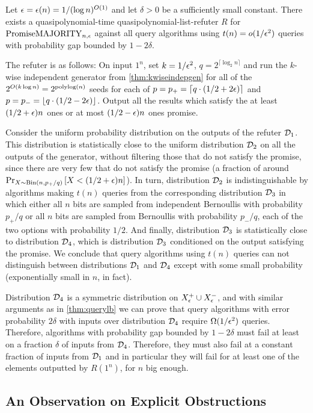 \begin{theorem}
Let $\epsilon = \epsilon(n) = 1/(\log n)^{O(1)}$ and let $\delta > 0$ be a sufficiently small constant.
There exists a quasipolynomial-time quasipolynomial-list-refuter
$R$ for $\mathrm{PromiseMAJORITY}_{n,\epsilon}$ against all query algorithms using $t(n) = o(1/\epsilon^2)$ queries with probability gap bounded by $1-2\delta$.
\end{theorem}
\begin{proofsketch}
The refuter is as follows: 
On input $1^n$, set $k = 1/\epsilon^2$, $q = 2^{\lceil \log_2 n \rceil}$ and run the $k$-wise independent generator from \cref{thm:kwiseindepgen}
for all of the $2^{O(k \log n)} = 2^{\text{polylog}(n)}$ seeds for each of 
$p = p_+ = \left\lceil q \cdot (1/2 + 2\epsilon) \right\rceil$ and
$p = p_- = \left\lfloor q \cdot (1/2 - 2\epsilon) \right\rfloor$. 
Output all the results which satisfy the at least $(1/2+\epsilon)n$ ones or at most $(1/2-\epsilon)n$ ones promise. 

Consider the uniform probability distribution on the outputs of the refuter $\mathcal{D}_1$. 
This distribution is statistically close to the uniform distribution $\mathcal{D}_2$ on all the outputs
of the generator, without filtering those that do not satisfy the promise, since there are 
very few that do not satisfy the promise 
(a fraction of around $\text{Pr}_{X \sim \text{Bin}(n, p_+/q)}\left[X < (1/2+\epsilon)n\right]$).
In turn, distribution $\mathcal{D}_2$ is indistinguishable by algorithms making $t(n)$ queries
from the corresponding distribution $\mathcal{D}_3$ in which either all $n$ bits are sampled from
independent Bernoullis with probability $p_+/q$ or all $n$ bits are sampled from Bernoullis with
probability $p_-/q$, each of the two options with probability $1/2$. 
And finally, distribution $\mathcal{D}_3$ is statistically close to distribution $\mathcal{D}_4$, which is distribution 
$\mathcal{D}_3$ conditioned on the output satisfying the promise. We conclude that query algorithms using $t(n)$
queries can not distinguish between distributions $\mathcal{D}_1$ and $\mathcal{D}_4$ except with some small probability
(exponentially small in $n$, in fact). 

Distribution $\mathcal{D}_4$ is a symmetric distribution on $X^+_\epsilon \cup X^-_\epsilon$, 
and with similar arguments as in \cref{thm:querylb} 
we can prove that query algorithms with error probability $2\delta$ with inputs 
over distribution $\mathcal{D}_4$ require $\Omega(1/\epsilon^2)$ queries. Therefore, algorithms
with probability gap bounded by $1-2\delta$ must fail at least on a fraction $\delta$ of
inputs from $\mathcal{D}_4$. Therefore, they must also fail at a constant fraction of inputs from $\mathcal{D}_1$
and in particular they will fail for at least one of the elements outputted by $R(1^n)$, for $n$ big enough.

\end{proofsketch}


\subsection{An Observation on Explicit Obstructions}
